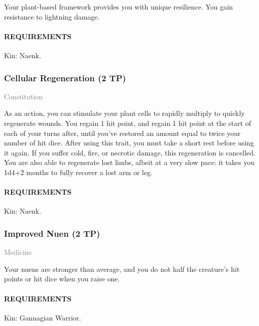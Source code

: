     \normalsize
    Your plant-based framework provides you with unique resilience.
    You gain resistance to lightning damage.
    \paragraph{REQUIREMENTS} Kin: Naenk.

    \subsubsection{Cellular Regeneration (2 TP)} \label{feat::cellularregeneration}
    \small{\textcolor{gray}{Constitution}}

    \normalsize
    As an action, you can stimulate your plant cells to rapidly multiply to quickly regenerate wounds.
    You regain 1 hit point, and regain 1 hit point at the start of each of your turns after, until you've restored an amount equal to twice your number of hit dice.
    After using this trait, you must take a short rest before using it again.
    If you suffer cold, fire, or necrotic damage, this regeneration is cancelled.
    You are also able to regenerate lost limbs, albeit at a very slow pace: it takes you 1d4+2 months to fully recover a lost arm or leg.
    \paragraph{REQUIREMENTS} Kin: Naenk.

    \subsubsection{Improved Nuen (2 TP)} \label{feat::improvednuen}
    \small{\textcolor{gray}{Medicine}}

    \normalsize
    Your nuens are stronger than average, and you do not half the creature's hit points or hit dice when you raise one.

    \paragraph{REQUIREMENTS} Kin: Gannagian Warrior.


